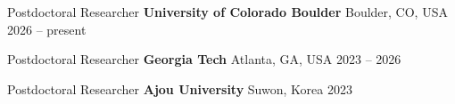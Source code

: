 
\begin{cventries}

  \cventry
    {Postdoctoral Researcher}
    {\textbf{University of Colorado Boulder}}
    {Boulder, CO, USA}
    {2026 -- present}
    {}

  \cventry
    {Postdoctoral Researcher}
    {\textbf{Georgia Tech}}
    {Atlanta, GA, USA}
    {2023 -- 2026}
    {}

  \cventry
    {Postdoctoral Researcher}
    {\textbf{Ajou University}}
    {Suwon, Korea}
    {2023}
    {}

\end{cventries}
